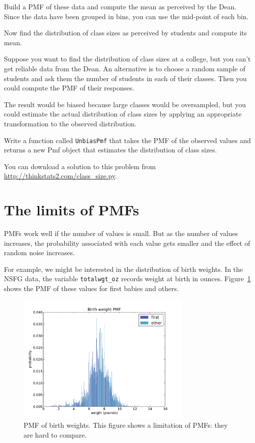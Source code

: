 \documentclass[12pt]{book}
\begin{document}
\begin{exercise}
Build a PMF of these data and compute the mean as perceived by the
Dean.  Since the data have been grouped in bins, you can use the
mid-point of each bin.

Now find the distribution of class sizes as perceived by students
and compute its mean.  

Suppose you want to find the distribution of class sizes at a
college, but you can't get reliable data from the Dean.
An alternative is to choose a random sample of students and ask them
the number of students in each of their classes.  Then you could compute
the PMF of their responses.

The result would be biased because large classes
would be oversampled, but you could estimate the actual
distribution of class sizes by applying an appropriate transformation
to the observed distribution.

Write a function called \verb"UnbiasPmf" that takes the PMF of the
observed values and returns a new Pmf object that estimates the
distribution of class sizes.

You can download a solution to this problem from
\url{http://thinkstats2.com/class_size.py}.

\end{exercise}



\section{The limits of PMFs}

PMFs work well if the number of values is small.  But as the
number of values increases, the probability associated with each value
gets smaller and the effect of random noise increases.

For example, we might be interested in the distribution of birth
weights.  In the NSFG data, the variable \verb"totalwgt_oz" records
weight at birth in ounces.  Figure~\ref{nsfg_birthwgt_pmf} shows
the PMF of these values for first babies and others.    

\begin{figure}
\centerline{\includegraphics[height=2.5in]{figs/nsfg_birthwgt_pmf.pdf}}
\caption{PMF of birth weights.  This figure shows a limitation
of PMFs: they are hard to compare.}
\label{nsfg_birthwgt_pmf}
\end{figure}
\end{document}
